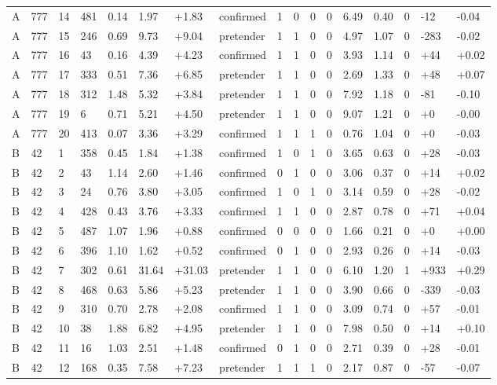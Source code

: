 \documentclass[11pt,a4paper]{article}
\begin{document}
{\begin{longtable}[]{@{}lllllllllllllllll@{}}
A & 777 & 14 & 481 & 0.14 & 1.97 & +1.83 & confirmed & 1 & 0 & 0 & 0 & 6.49 & 0.40 & 0 & -12 & -0.04 \\
A & 777 & 15 & 246 & 0.69 & 9.73 & +9.04 & pretender & 1 & 1 & 0 & 0 & 4.97 & 1.07 & 0 & -283 & -0.02 \\
A & 777 & 16 & 43 & 0.16 & 4.39 & +4.23 & confirmed & 1 & 1 & 0 & 0 & 3.93 & 1.14 & 0 & +44 & +0.02 \\
A & 777 & 17 & 333 & 0.51 & 7.36 & +6.85 & pretender & 1 & 1 & 0 & 0 & 2.69 & 1.33 & 0 & +48 & +0.07 \\
A & 777 & 18 & 312 & 1.48 & 5.32 & +3.84 & pretender & 1 & 1 & 0 & 0 & 7.92 & 1.18 & 0 & -81 & -0.10 \\
A & 777 & 19 & 6 & 0.71 & 5.21 & +4.50 & pretender & 1 & 1 & 0 & 0 & 9.07 & 1.21 & 0 & +0 & -0.00 \\
A & 777 & 20 & 413 & 0.07 & 3.36 & +3.29 & confirmed & 1 & 1 & 1 & 0 & 0.76 & 1.04 & 0 & +0 & -0.03 \\
B & 42 & 1 & 358 & 0.45 & 1.84 & +1.38 & confirmed & 1 & 0 & 1 & 0 & 3.65 & 0.63 & 0 & +28 & -0.03 \\
B & 42 & 2 & 43 & 1.14 & 2.60 & +1.46 & confirmed & 0 & 1 & 0 & 0 & 3.06 & 0.37 & 0 & +14 & +0.02 \\
B & 42 & 3 & 24 & 0.76 & 3.80 & +3.05 & confirmed & 1 & 0 & 1 & 0 & 3.14 & 0.59 & 0 & +28 & -0.02 \\
B & 42 & 4 & 428 & 0.43 & 3.76 & +3.33 & confirmed & 1 & 1 & 0 & 0 & 2.87 & 0.78 & 0 & +71 & +0.04 \\
B & 42 & 5 & 487 & 1.07 & 1.96 & +0.88 & confirmed & 0 & 0 & 0 & 0 & 1.66 & 0.21 & 0 & +0 & +0.00 \\
B & 42 & 6 & 396 & 1.10 & 1.62 & +0.52 & confirmed & 0 & 1 & 0 & 0 & 2.93 & 0.26 & 0 & +14 & -0.03 \\
B & 42 & 7 & 302 & 0.61 & 31.64 & +31.03 & pretender & 1 & 1 & 0 & 0 & 6.10 & 1.20 & 1 & +933 & +0.29 \\
B & 42 & 8 & 468 & 0.63 & 5.86 & +5.23 & pretender & 1 & 1 & 0 & 0 & 3.90 & 0.66 & 0 & -339 & -0.03 \\
B & 42 & 9 & 310 & 0.70 & 2.78 & +2.08 & confirmed & 1 & 1 & 0 & 0 & 3.09 & 0.74 & 0 & +57 & -0.01 \\
B & 42 & 10 & 38 & 1.88 & 6.82 & +4.95 & pretender & 1 & 1 & 0 & 0 & 7.98 & 0.50 & 0 & +14 & +0.10 \\
B & 42 & 11 & 16 & 1.03 & 2.51 & +1.48 & confirmed & 0 & 1 & 0 & 0 & 2.71 & 0.39 & 0 & +28 & -0.01 \\
B & 42 & 12 & 168 & 0.35 & 7.58 & +7.23 & pretender & 1 & 1 & 1 & 0 & 2.17 & 0.87 & 0 & -57 & -0.07 \\

\end{longtable}}
\end{document}
